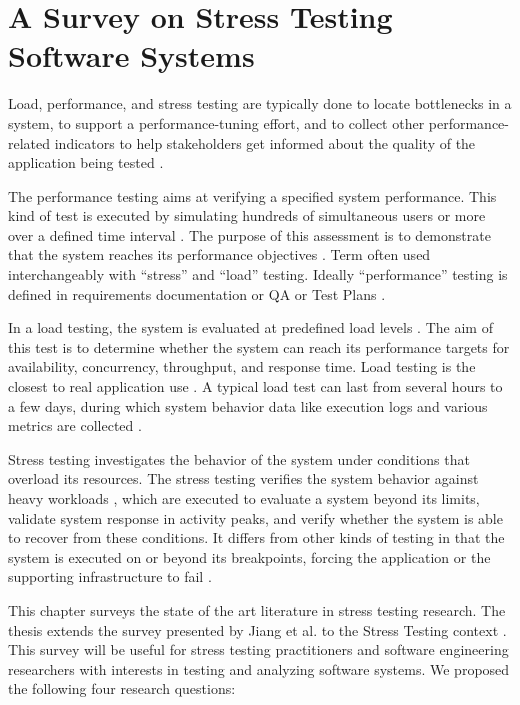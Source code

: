 \chapter{A Survey on Stress Testing Software Systems}

Load, performance, and stress testing are typically done to locate bottlenecks in a system, to support a performance-tuning effort, and to collect other performance-related indicators to help stakeholders get informed about the quality of the application being tested \cite{Sandler2004} \cite{Corporation2007}. 


The performance testing aims at verifying a specified system performance. This kind of test is executed by simulating hundreds of simultaneous users or more over a defined time interval \cite{DiLucca2006}. The purpose of this assessment is to demonstrate that the system reaches its performance objectives \cite{Sandler2004}.  Term often used interchangeably with “stress” and “load” testing. Ideally “performance” testing is defined in requirements documentation or QA or Test Plans \cite{Lewis2005}.


In a load testing, the system is evaluated at predefined load levels \cite{DiLucca2006}. The aim of this test is to determine whether the system can reach its performance targets for availability, concurrency, throughput, and response time. Load testing is the closest to real application use \cite{Molyneaux2009}. A typical load test can last from several hours to a few days, during which system behavior data like execution logs and various metrics are collected \cite{Afzal2009a}. 

Stress testing investigates the behavior of the system under conditions
that overload its resources. The stress testing verifies the system behavior against heavy workloads \cite{Sandler2004} \cite{Lewis2005}, which are executed to evaluate a system beyond its limits, validate system response in activity peaks, and verify whether the system is able to recover from these conditions. It differs from other kinds of testing in that the system is executed on or beyond its breakpoints, forcing the application or the supporting infrastructure to fail \cite{DiLucca2006} \cite{Molyneaux2009}.


This chapter surveys the state of the art literature in stress testing research. The thesis extends the survey presented by Jiang et al. to the Stress Testing context \cite{Jiang2010}.  This survey will be useful for stress testing practitioners and software engineering researchers with interests in testing and analyzing software systems. We proposed the following four research questions:


